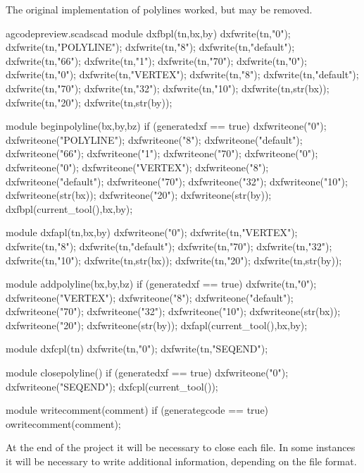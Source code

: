 \documentclass{ltxdoc}
\begin{document}
The original implementation of polylines worked, but may be removed.
 
\lstset{firstnumber=\thegcpscad}
\begin{writecode}{a}{gcodepreview.scad}{scad}
module dxfbpl(tn,bx,by) {
    dxfwrite(tn,"0");
    dxfwrite(tn,"POLYLINE");
    dxfwrite(tn,"8");
    dxfwrite(tn,"default");
    dxfwrite(tn,"66");
    dxfwrite(tn,"1");
    dxfwrite(tn,"70");
    dxfwrite(tn,"0");
    dxfwrite(tn,"0");
    dxfwrite(tn,"VERTEX");
    dxfwrite(tn,"8");
    dxfwrite(tn,"default");
    dxfwrite(tn,"70");
    dxfwrite(tn,"32");
    dxfwrite(tn,"10");
    dxfwrite(tn,str(bx));
    dxfwrite(tn,"20");
    dxfwrite(tn,str(by));
}

module beginpolyline(bx,by,bz) {
if (generatedxf == true) {
    dxfwriteone("0");
    dxfwriteone("POLYLINE");
    dxfwriteone("8");
    dxfwriteone("default");
    dxfwriteone("66");
    dxfwriteone("1");
    dxfwriteone("70");
    dxfwriteone("0");
    dxfwriteone("0");
    dxfwriteone("VERTEX");
    dxfwriteone("8");
    dxfwriteone("default");
    dxfwriteone("70");
    dxfwriteone("32");
    dxfwriteone("10");
    dxfwriteone(str(bx));
    dxfwriteone("20");
    dxfwriteone(str(by));
    dxfbpl(current_tool(),bx,by);}
}

module dxfapl(tn,bx,by) {
    dxfwriteone("0");
    dxfwrite(tn,"VERTEX");
    dxfwrite(tn,"8");
    dxfwrite(tn,"default");
    dxfwrite(tn,"70");
    dxfwrite(tn,"32");
    dxfwrite(tn,"10");
    dxfwrite(tn,str(bx));
    dxfwrite(tn,"20");
    dxfwrite(tn,str(by));
}

module addpolyline(bx,by,bz) {
if (generatedxf == true) {
    dxfwrite(tn,"0");
    dxfwriteone("VERTEX");
    dxfwriteone("8");
    dxfwriteone("default");
    dxfwriteone("70");
    dxfwriteone("32");
    dxfwriteone("10");
    dxfwriteone(str(bx));
    dxfwriteone("20");
    dxfwriteone(str(by));
    dxfapl(current_tool(),bx,by);
    }
}

module dxfcpl(tn) {
    dxfwrite(tn,"0");
    dxfwrite(tn,"SEQEND");
}

module closepolyline() {
if (generatedxf == true) {
    dxfwriteone("0");
    dxfwriteone("SEQEND");
    dxfcpl(current_tool());
    }
}

module writecomment(comment) {
if (generategcode == true) {
	owritecomment(comment);
}
}

\end{writecode}
\addtocounter{gcpscad}{92}
 
At the end of the project it will be necessary to close each file. 
In some instances it will be necessary to write additional information,
depending on the file format.
 
\end{document}
